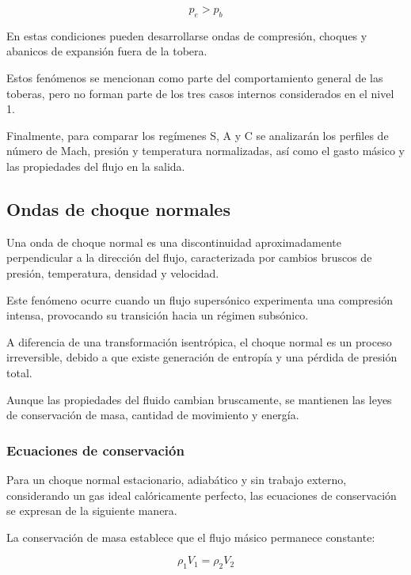\documentclass[12pt,letterpaper]{article}
\numberwithin{equation}{section}
\begin{document}
\begin{equation}
    p_e>p_b
\end{equation}

En estas condiciones pueden desarrollarse
ondas de compresión, choques y abanicos
de expansión fuera de la tobera.

Estos fenómenos se mencionan como parte
del comportamiento general de las toberas,
pero no forman parte de los tres casos
internos considerados en el nivel 1.

Finalmente, para comparar los regímenes
S, A y C se analizarán los perfiles
de número de Mach, presión y temperatura
normalizadas, así como el gasto másico
y las propiedades del flujo en la salida.



\subsection{Ondas de choque normales}

Una onda de choque normal es una discontinuidad
aproximadamente perpendicular a la dirección del
flujo, caracterizada por cambios bruscos de presión,
temperatura, densidad y velocidad.

Este fenómeno ocurre cuando un flujo supersónico
experimenta una compresión intensa, provocando
su transición hacia un régimen subsónico.

A diferencia de una transformación isentrópica,
el choque normal es un proceso irreversible,
debido a que existe generación de entropía
y una pérdida de presión total.

Aunque las propiedades del fluido cambian
bruscamente, se mantienen las leyes de
conservación de masa, cantidad de movimiento
y energía.

\subsubsection{Ecuaciones de conservación}

Para un choque normal estacionario, adiabático
y sin trabajo externo, considerando un gas
ideal calóricamente perfecto, las ecuaciones
de conservación se expresan de la siguiente manera.

La conservación de masa establece que el
flujo másico permanece constante:

\begin{equation}
    \rho_1 V_1=\rho_2 V_2
\end{equation}
\end{document}
